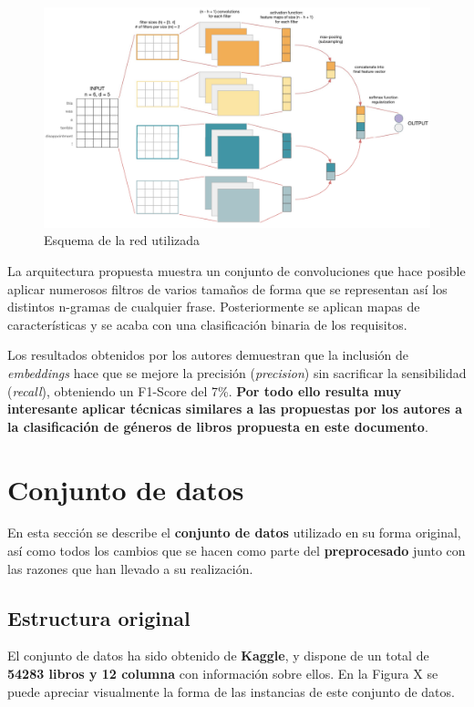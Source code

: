 \documentclass[12pt,a4paper, xcolor=table]{article}
\begin{document}
  \begin{figure}[!h]
    \centering
    \includegraphics[width=450px]{img/CNN Word2vect.png}
    \caption{Esquema de la red utilizada}
    \end{figure}

\vspace{3mm}

La arquitectura propuesta muestra un conjunto de convoluciones que hace posible aplicar numerosos filtros de varios tamaños de forma que se representan así los distintos n-gramas de cualquier frase. Posteriormente se aplican mapas de características y se acaba con una clasificación binaria de los requisitos.

\vspace{3mm}

Los resultados obtenidos por los autores demuestran que la inclusión de \textit{embeddings} hace que se mejore la precisión (\textit{precision}) sin sacrificar la sensibilidad (\textit{recall}), obteniendo un F1-Score del 7\%. \textbf{Por todo ello resulta muy interesante aplicar técnicas similares a las propuestas por los autores a la clasificación de géneros de libros propuesta en este documento}.

\newpage

\section{Conjunto de datos}
    En esta sección se describe el \textbf{conjunto de datos} utilizado en su forma original, así como todos los cambios que se hacen como parte del \textbf{preprocesado} junto con las razones que han llevado a su realización.

    \subsection{Estructura original}
    El conjunto de datos ha sido obtenido de \textbf{Kaggle}\cite{gbbe}, y dispone de un total de \textbf{54283 libros y 12 columna} con información sobre ellos. En la Figura X se puede apreciar visualmente la forma de las instancias de este conjunto de datos.
\end{document}
